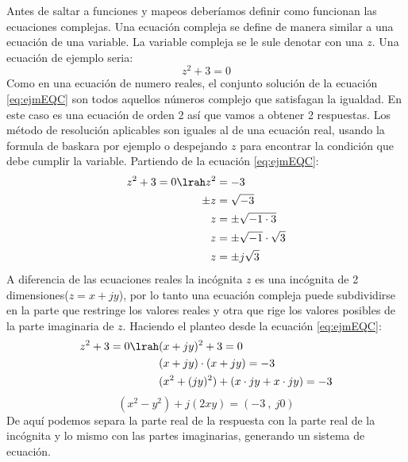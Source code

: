 Antes de saltar a funciones y mapeos deberíamos definir como funcionan las ecuaciones complejas. Una ecuación compleja se define de manera similar a una ecuación de una variable. La variable compleja se le sule denotar con una $z$. Una ecuación de ejemplo seria:
\begin{equation}\label{eq:ejmEQC}
    z^2+3=0
\end{equation}
Como en una ecuación de numero reales, el conjunto solución de la ecuación \ref{eq:ejmEQC} son todos aquellos números complejo que satisfagan la igualdad. En este caso es una ecuación de orden 2 así que vamos a obtener 2 respuestas. Los método de resolución aplicables son iguales al de una ecuación real, usando la formula de baskara por ejemplo o despejando $z$ para encontrar la condición que debe cumplir la variable. Partiendo de la ecuación \ref{eq:ejmEQC}:
\begin{equation}\label{eq:ejmEQCS1}
    \begin{aligned}
         z^2+3=0 \lrah z^2&=-3\\
                        \pm z&=\sqrt{-3}\\
                        z&=\pm \sqrt{-1\cdot 3}\\
                        z&=\pm \sqrt{-1}\cdot\sqrt{3}\\
                        z&=\pm j\sqrt{3}
    \end{aligned}
\end{equation}
A diferencia de las ecuaciones reales la incógnita $z$ es una incógnita de 2 dimensiones($z=x+jy$), por lo tanto una ecuación compleja puede subdividirse en la parte que restringe los valores reales y otra que rige los valores posibles de la parte imaginaria de $z$. Haciendo el planteo desde la ecuación \ref{eq:ejmEQC}:
\begin{equation}
    \begin{aligned}
     z^2+3=0 \lrah &(x+jy)^2+3=0\\
                      &(x+jy)\cdot(x+jy)=-3\\
                  &(x^2+(jy)^2)+(x\cdot jy + x\cdot jy)=-3
    \end{aligned}
\end{equation}
\begin{equation}
    (x^2-y^2)+j(2xy)=(-3\ ,\ j0)
\end{equation}
De aquí podemos separa la parte real de la respuesta con la parte real de la incógnita y lo mismo con las partes imaginarias, generando un sistema de ecuación.

